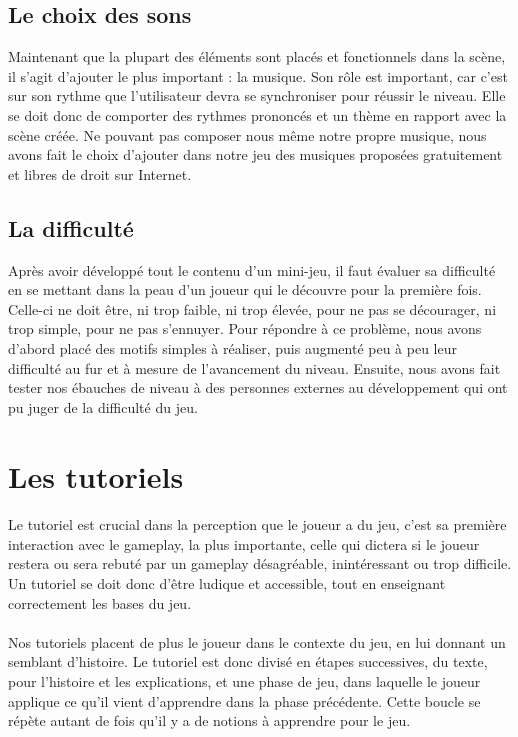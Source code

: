 \subsection{Le choix des sons}

Maintenant que la plupart des éléments sont placés et fonctionnels dans la scène, il s'agit d'ajouter le plus important : la musique. Son rôle est important, car c'est sur son rythme que l'utilisateur devra se synchroniser pour réussir le niveau. Elle se doit donc de comporter des rythmes prononcés et un thème en rapport avec la scène créée.
Ne pouvant pas composer nous même notre propre musique, nous avons fait le choix d'ajouter dans notre jeu des musiques proposées gratuitement et libres de droit sur Internet.

\subsection{La difficulté}

Après avoir développé tout le contenu d'un mini-jeu, il faut évaluer sa difficulté en se mettant dans la peau d'un joueur qui le découvre pour la première fois. Celle-ci ne doit être, ni trop faible, ni trop élevée, pour ne pas se décourager, ni trop simple, pour ne pas s'ennuyer. Pour répondre à ce problème, nous avons d'abord placé des motifs simples à réaliser, puis augmenté peu à peu leur difficulté au fur et à mesure de l'avancement du niveau. Ensuite, nous avons fait tester nos ébauches de niveau à des personnes externes au développement qui ont pu juger de la difficulté du jeu.


\section{Les tutoriels}

\paragraph{}
Le tutoriel est crucial dans la perception que le joueur a du jeu, c'est sa première interaction avec le gameplay, la plus importante, celle qui dictera si le joueur restera ou sera rebuté par un gameplay désagréable, inintéressant ou trop difficile. Un tutoriel se doit donc d'être ludique et accessible, tout en enseignant correctement les bases du jeu.

\paragraph{}
Nos tutoriels placent de plus le joueur dans le contexte du jeu, en lui donnant un semblant d'histoire. Le tutoriel est donc divisé en étapes successives, du texte, pour l'histoire et les explications, et une phase de jeu, dans laquelle le joueur applique ce qu'il vient d'apprendre dans la phase précédente. Cette boucle se répète autant de fois qu'il y a de notions à apprendre pour le jeu.

